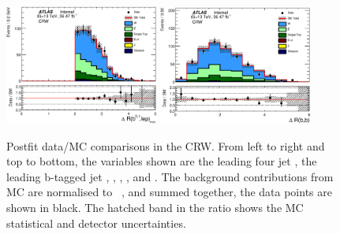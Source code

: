 \begin{figure}[!htb]
  \includegraphics[width=0.45\textwidth]{figures/wJets/postfit/MinDRBLep_CRW.eps}
  \includegraphics[width=0.45\textwidth]{figures/wJets/postfit/DRBB_CRW.eps}
  \caption{Postfit data/MC comparisons in the CRW. From left to right and top to bottom, the variables shown are the leading four jet \pt, the leading b-tagged jet \pt, \HT, \htsig, \mindrblep, and \drbjetbjet. The background contributions from MC are normalised to \intlumi\ \ifb, and summed together, the data points are shown in black. The hatched band in the ratio shows the MC statistical and detector uncertainties.}
  \label{fig:CRWpts}
\end{figure}

